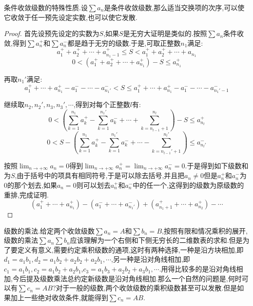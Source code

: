 条件收敛级数的特殊性质.设$\sum a_n$是条件收敛级数,那么适当交换项的次序,可以使它收敛于任一预先设定实数,也可以使它发散.
\begin{proof}
	
	首先设预先设定的实数为$S$,如果$S$是无穷大证明是类似的.按照$\sum a_n$条件收敛,得到$\sum a_n^+$和$\sum a_n^-$都是趋于无穷的级数.于是,可取正整数$n_1$满足:
	$$a_1^++a_2^++\cdots+a_{n_1-1}^+\le S<a_1^++a_2^++\cdots+a_{n_1}$$
	$$0<(a_1^++a_2^++\cdots+a_{n_1}^+)-S\le a_{n_1}^+$$
	
	再取$n_1'$满足:
	$$a_1^++\cdots+a_{n_1}^+-a_1^--\cdots-a_{n_1'}^-<S\le
	a_1^++\cdots+a_{n_1}^+-a_1^--\cdots-a_{n_1'-1}^-$$
	
	继续取$n_2,n_2',n_3,n_3',\cdots$,得到对每个正整数$l$有:
	$$0<\left(\sum_{k=1}^{n_1}a_k^+-\sum_{k=1}^{n_1'}a_k^-+\cdots+\sum_{k=n_{l-1}+1}^{n_l}\right)-S\le a_{n_l}^+$$
	$$0<S-\left(\sum_{k=1}^{n_1}a_k^+-\sum_{k=1}^{n_1'}a_k^-+\cdots-\sum_{k=n_{l-1}'+1}^{n_l'}\right)\le a_{n_l'}^-$$
	
	按照$\lim_{n\to+\infty}a_n=0$得到$\lim_{n\to+\infty}a_n^+=\lim_{n\to+\infty}a_n^-=0$.于是得到如下级数和为$S$,由于括号中的项具有相同符号,于是可以除去括号,并且把$a_n\not=0$但是$a_n^+$和$a_n^-$为0的那个划去,如果$a_n=0$则可以划去$a_n^+$和$a_n^-$中的任一个,这得到的级数为原级数的重排,完成证明.
	$$\left(a_1^++\cdots+a_{n_1}^+\right)-\left(a_1^-+\cdots+a_{n_1'}^-\right)+\left(a_{n_1+1}^++\cdots+a_{n_2}^+\right)-\cdots$$
	
\end{proof}

级数的乘法.给定两个收敛级数$\sum a_n=A$和$\sum b_n=B$,按照有限和情况乘积的展开,级数的乘法$\sum a_n\sum b_n$应该理解为一个右侧和下侧无穷长的二维数表的求和.但是为了要定义有意义,需要约定乘积级数的通项,这时有两种选择,一种是沿方块相加,即$d_1=a_1b_1,d_2=a_1b_2+a_2b_2+a_2b_1,\cdots$,另一种是沿对角线相加,即$c_1=a_1b_1,c_2=a_1b_2+a_2b_1$,$c_3=a_1b_3+a_2b_2+a_3b_1,\cdots$.用得比较多的是沿对角线相加,今后提及级数乘法总约定新级数是沿对角线相加.那么一个自然的问题是,何时可以有$\sum c_n=AB$?对于一般的级数,两个收敛级数的乘积级数甚至可以发散.但是如果加上一些绝对收敛条件,就能得到$\sum c_n=AB$.

